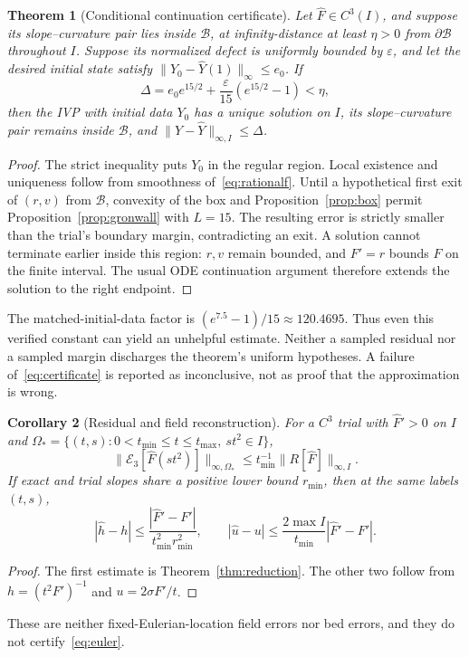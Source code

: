 \documentclass[11pt,a4paper]{article}
\newtheorem{theorem}{Theorem}[section]
\newtheorem{corollary}[theorem]{Corollary}
\theoremstyle{definition}
\theoremstyle{remark}
\newcommand{\E}{\mathcal E}
\begin{document}
\begin{theorem}[Conditional continuation certificate]\label{thm:certificate}
Let $\widehat F\in C^3(I)$, and suppose its slope--curvature pair lies inside $\mathcal B$, at infinity-distance at least $\eta>0$ from $\partial\mathcal B$ throughout $I$. Suppose its normalized defect is uniformly bounded by $\varepsilon$, and let the desired initial state satisfy
$\|Y_0-\widehat Y(1)\|_\infty\le e_0$. If
\begin{equation}
\Delta=e_0e^{15/2}+\frac{\varepsilon}{15}(e^{15/2}-1)<\eta,
\label{eq:certificate}
\end{equation}
then the IVP with initial data $Y_0$ has a unique solution on $I$,
its slope--curvature pair remains inside $\mathcal B$, and
$\|Y-\widehat Y\|_{\infty,I}\le\Delta$.
\end{theorem}
\begin{proof}
The strict inequality puts $Y_0$ in the regular region. Local existence and uniqueness follow from smoothness of~\eqref{eq:rationalf}. Until a hypothetical first exit of $(r,v)$ from $\mathcal B$, convexity of the box and Proposition~\ref{prop:box} permit Proposition~\ref{prop:gronwall} with $L=15$.
The resulting error is strictly smaller than the trial's boundary margin, contradicting an exit. A solution cannot terminate earlier inside this region: $r,v$ remain bounded, and $F'=r$ bounds $F$ on the finite interval. The usual ODE continuation argument therefore extends the solution to the right endpoint.
\end{proof}

The matched-initial-data factor is
$(e^{7.5}-1)/15\approx120.4695$. Thus even this verified constant can yield an unhelpful estimate. Neither a sampled residual nor a sampled margin discharges the theorem's uniform hypotheses. A failure of~\eqref{eq:certificate} is reported as inconclusive, not as proof that the approximation is wrong.

\begin{corollary}[Residual and field reconstruction]\label{cor:lift}
For a $C^3$ trial with $\widehat F'>0$ on $I$ and
$\Omega_*=\{(t,s):0<t_{\min}\le t\le t_{\max},\ st^2\in I\}$,
\[
\|\E_3[\widehat F(st^2)]\|_{\infty,\Omega_*}
\le t_{\min}^{-1}\|R[\widehat F]\|_{\infty,I}.
\]
If exact and trial slopes share a positive lower bound $r_{\min}$, then at the same labels $(t,s)$,
\[
|\widehat h-h|\le
\frac{|\widehat F'-F'|}{t_{\min}^2r_{\min}^2},\qquad
|\widehat u-u|\le\frac{2\max I}{t_{\min}}|\widehat F'-F'|.
\]
\end{corollary}
\begin{proof}
The first estimate is Theorem~\ref{thm:reduction}. The other two follow from
$h=(t^2F')^{-1}$ and $u=2\sigma F'/t$.
\end{proof}
These are neither fixed-Eulerian-location field errors nor bed errors, and they do not certify~\eqref{eq:euler}.
\end{document}
